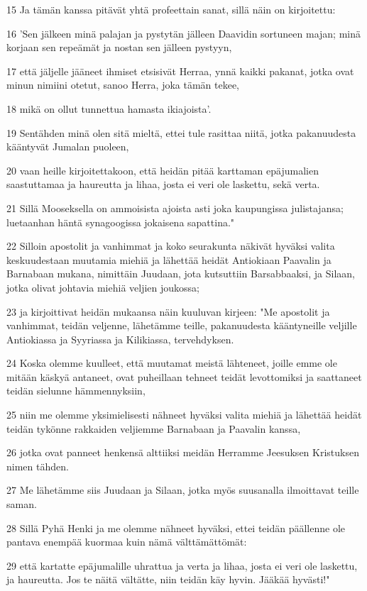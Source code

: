 \par 15 Ja tämän kanssa pitävät yhtä profeettain sanat, sillä näin on kirjoitettu:
\par 16 'Sen jälkeen minä palajan ja pystytän jälleen Daavidin sortuneen majan; minä korjaan sen repeämät ja nostan sen jälleen pystyyn,
\par 17 että jäljelle jääneet ihmiset etsisivät Herraa, ynnä kaikki pakanat, jotka ovat minun nimiini otetut, sanoo Herra, joka tämän tekee,
\par 18 mikä on ollut tunnettua hamasta ikiajoista'.
\par 19 Sentähden minä olen sitä mieltä, ettei tule rasittaa niitä, jotka pakanuudesta kääntyvät Jumalan puoleen,
\par 20 vaan heille kirjoitettakoon, että heidän pitää karttaman epäjumalien saastuttamaa ja haureutta ja lihaa, josta ei veri ole laskettu, sekä verta.
\par 21 Sillä Mooseksella on ammoisista ajoista asti joka kaupungissa julistajansa; luetaanhan häntä synagoogissa jokaisena sapattina."
\par 22 Silloin apostolit ja vanhimmat ja koko seurakunta näkivät hyväksi valita keskuudestaan muutamia miehiä ja lähettää heidät Antiokiaan Paavalin ja Barnabaan mukana, nimittäin Juudaan, jota kutsuttiin Barsabbaaksi, ja Silaan, jotka olivat johtavia miehiä veljien joukossa;
\par 23 ja kirjoittivat heidän mukaansa näin kuuluvan kirjeen: "Me apostolit ja vanhimmat, teidän veljenne, lähetämme teille, pakanuudesta kääntyneille veljille Antiokiassa ja Syyriassa ja Kilikiassa, tervehdyksen.
\par 24 Koska olemme kuulleet, että muutamat meistä lähteneet, joille emme ole mitään käskyä antaneet, ovat puheillaan tehneet teidät levottomiksi ja saattaneet teidän sielunne hämmennyksiin,
\par 25 niin me olemme yksimielisesti nähneet hyväksi valita miehiä ja lähettää heidät teidän tykönne rakkaiden veljiemme Barnabaan ja Paavalin kanssa,
\par 26 jotka ovat panneet henkensä alttiiksi meidän Herramme Jeesuksen Kristuksen nimen tähden.
\par 27 Me lähetämme siis Juudaan ja Silaan, jotka myös suusanalla ilmoittavat teille saman.
\par 28 Sillä Pyhä Henki ja me olemme nähneet hyväksi, ettei teidän päällenne ole pantava enempää kuormaa kuin nämä välttämättömät:
\par 29 että kartatte epäjumalille uhrattua ja verta ja lihaa, josta ei veri ole laskettu, ja haureutta. Jos te näitä vältätte, niin teidän käy hyvin. Jääkää hyvästi!"
